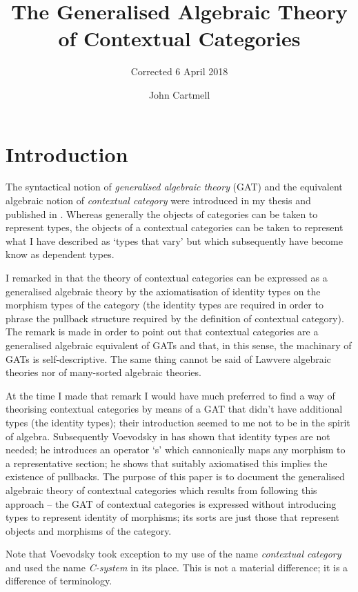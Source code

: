 \documentclass[10pt,a4paper]{scrartcl}
\title{The Generalised Algebraic Theory of Contextual Categories}
\subtitle{Corrected 6 April 2018}
\author{John Cartmell}
\begin{document}
\maketitle


\section{Introduction}
The syntactical notion of \textit{generalised algebraic theory} (GAT) and the  equivalent algebraic notion of \textit{contextual category} were introduced in my thesis \cite{Cartmell78} and published in \cite{Cartmell86}. Whereas generally the objects of categories can be taken to represent types, the objects of a contextual categories can be taken to represent what I have described as `types that vary' but which subsequently have become know as dependent types. 

I remarked in
\cite{Cartmell78} that the theory of contextual categories can be expressed as a generalised algebraic theory by the axiomatisation of identity types on the morphism types of the category 
(the identity types are required in order to phrase the pullback structure required by the definition of contextual category). The remark is made in order to point out that contextual categories are a generalised algebraic equivalent of GATs and that, in this sense, the machinary of GATs is self-descriptive. The same thing cannot be said of Lawvere algebraic theories nor of many-sorted algebraic theories.  

At the time I made that remark I would have much preferred to find a way of theorising
contextual categories by means of a GAT that didn't have additional types (the identity types);  their introduction seemed to me not to be in the spirit of algebra. 
Subsequently Voevodsky in \cite{Voevodsky14C} has shown that identity types are not needed; he introduces an operator `s' which cannonically maps any morphism to a representative section; he shows that suitably axiomatised this implies the existence of pullbacks.  The purpose of this paper is to document the generalised algebraic theory
of contextual categories which results from following this approach -- the GAT of 
contextual categories is expressed without introducing types to represent identity of morphisms; its sorts are just those that represent objects and morphisms of the category.  

Note that Voevodsky took exception to my use of the name \textit{contextual category} and used
the name \textit{C-system} in its place. This is not a material difference; it is a 
difference of terminology.
\end{document}
